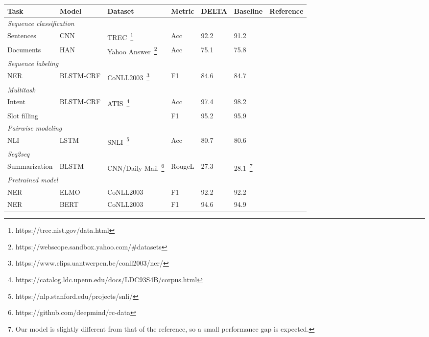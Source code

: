 \documentclass{article}
\begin{document}
\begin{minipage}{\textwidth}
  \label{nlp-performance-table}
  \centering
  \small
  \begin{tabular}{lllllll}
    \toprule
    Task & Model & Dataset & Metric & DELTA & Baseline & Reference \\
    \toprule
    \multicolumn{2}{l}{\textit{Sequence classification}} & & & & \\
    Sentences  & CNN & TREC~\footnote{https://trec.nist.gov/data.html} & Acc & 92.2 & 91.2 & \cite{kim2014convolutional} \\
    Documents  & HAN & Yahoo Answer~\footnote{https://webscope.sandbox.yahoo.com/\#datasets} & Acc & 75.1 & 75.8 & \cite{yang2016hierarchical}  \\
    \midrule
    \multicolumn{2}{l}{\textit{Sequence labeling}} & & & & \\
    NER & BLSTM-CRF & CoNLL2003~\footnote{https://www.clips.uantwerpen.be/conll2003/ner/} & F1 & 84.6 & 84.7 & \cite{huang2015bidirectional}\\
    \midrule
    \textit{Multitask}  & & & & \\
    Intent & BLSTM-CRF & ATIS~\footnote{https://catalog.ldc.upenn.edu/docs/LDC93S4B/corpus.html} & Acc & 97.4 & 98.2 & \cite{liu2016attention}\\
    Slot filling &  &  & F1 & 95.2 & 95.9 & \\
    \midrule
    \multicolumn{2}{l}{\textit{Pairwise modeling}}  & & & & \\
    NLI & LSTM & SNLI~\footnote{https://nlp.stanford.edu/projects/snli/} & Acc & 80.7 & 80.6 & \cite{bowman2016fast} \\
    \midrule
    \textit{Seq2seq}  & & & & \\
    Summarization & BLSTM & CNN/Daily Mail~\footnote{https://github.com/deepmind/rc-data} & RougeL & 27.3 & 28.1~\footnote{Our model is slightly different from that of the reference, so a small performance gap is expected.} & \cite{see2017get}\\
\midrule
    \multicolumn{2}{l}{\textit{Pretrained model}}  & & & & \\
    NER & ELMO & CoNLL2003 & F1 & 92.2 & 92.2 & \cite{Peters:2018}\\
    NER & BERT & CoNLL2003 & F1 & 94.6 & 94.9 & \cite{devlin2019bert} \\
    \bottomrule
  \end{tabular}
\end{minipage}
\end{document}
